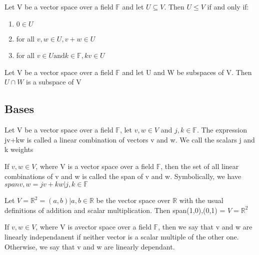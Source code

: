 \documentclass{article}
\begin{document}
\begin{theorem}
    Let V be a vector space over a field $\mathbb{F}$ and let $ U \subseteq V$.
    Then $ U \leq V$ if and only if:
    \begin{enumerate}
	\item $ 0 \in U$
	\item for all $v,w \in U, v+w \in U$
	\item for all $ v\in U \text{and} k \in \mathbb{F}, kv \in U$
    \end{enumerate}
\end{theorem}

\begin{theorem}
    Let V be a vector space over a field $\mathbb{F}$ and let U and W be
    subspaces of V. Then $ U \cap W$ is a subspace of V
\end{theorem}

\subsection{Bases}

\begin{definition}
    Let V be a vector space over a field $\mathbb{F}$, let $v,w \in V$ and
    $j,k \in \mathbb{F}$. The expression jv+kw is called a linear combination
    of vectors v and w. We call the scalars j and k weights
\end{definition}

\begin{definition}[Span]
    If $v,w \in V$, where V is a vector space over a field $\mathbb{F}$, then
    the set of all linear combinations of v and w is called the span of v and w.
    Symbolically, we have  $ span{v,w} = {jv+kw|j,k \in \mathbb{F}} $
\end{definition}

\begin{theorem}
    Let $V=\mathbb{R}^2 = {(a,b)|a,b \in \mathbb{R}}$ be the vector space over
    $\mathbb{R}$ with the usual definitions of addition and scalar multiplication.
    Then span{(1,0),(0,1)} = $V=\mathbb{R}^2$
\end{theorem}

\begin{definition}
    If $v,w \in V$, where V is avector space over a field $\mathbb{F}$, then we
    say that v and w are linearly independanent if neither vector is a scalar
    multiple of the other one. Otherwise, we say that v and w are linearly dependant.
\end{definition}
\end{document}
